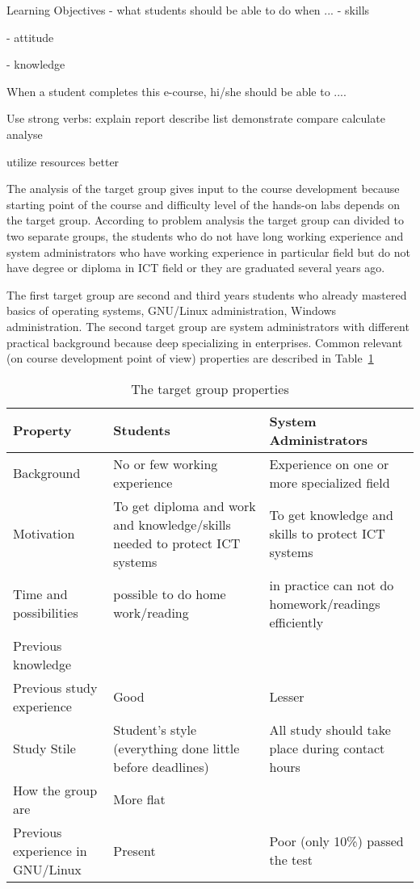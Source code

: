 Learning Objectives - what students should be able to do when ...
- skills 

- attitude

- knowledge

When a student completes this e-course, hi/she should be able to ....

Use strong verbs:
explain
report
describe
list
demonstrate
compare
calculate
analyse

utilize resources better






The analysis of the target group gives input to the course development because starting point of the course and difficulty level of the hands-on labs depends on the target group. According to problem analysis the target group can divided to two separate groups, the students who do not have long working experience and system administrators who have working experience in particular field but do not have degree or diploma in \gls{ICT} field or they are graduated several years ago.

The first target group are second and third years students who already mastered basics of operating systems, GNU/Linux administration, Windows administration. The second target group are system administrators with different practical background because deep specializing in enterprises. Common relevant (on course development point of view)  properties are described in Table~\ref{tab:targetgroup}
\begin{table}[h]
\centering
\caption{The target group properties}

\begin{tabular}{|p{4cm}|p{5cm}|p{5cm}|}
\hline 
\color{blue}
Property & \color{blue} Students & \color{blue} System Administrators \\ 
\hline 
Background & No or few working experience & Experience on one or more specialized field \\ 
\hline 
Motivation & To get diploma and work and knowledge/skills needed to protect \gls{ICT} systems & To get knowledge and skills to protect \gls{ICT} systems \\ 
\hline 
Time and possibilities & possible to do home work/reading & in practice can not do homework/readings efficiently  \\ 
\hline 
Previous knowledge &   &   \\ 
\hline 
Previous study experience & Good & Lesser \\ 
\hline 
Study Stile & Student's style (everything done little before deadlines) & All study should take place during contact hours  \\ 
\hline 
How {\color{red}{homogeenne}} the group are  & More flat & {\color{red}{ebaühtlane}} \\ 
\hline 
Previous experience in GNU/Linux & Present & Poor (only 10\%) passed the test  \\ 
\hline 
\end{tabular} 

\label{tab:targetgroup}
\end{table}

